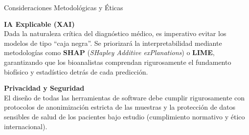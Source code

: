 \documentclass[12pt,letterpaper]{article}
\begin{document}
\begin{infobox}[colframe=tealmed, colback=white]{Consideraciones Metodológicas y Éticas}
    
    \begin{minipage}{0.48\textwidth}
        \textbf{\color{tealmed} IA Explicable (XAI)}\\[0.2cm]
        Dada la naturaleza crítica del diagnóstico médico, es imperativo evitar los modelos de tipo ``caja negra''. Se priorizará la interpretabilidad mediante metodologías como \textbf{SHAP} (\emph{SHapley Additive exPlanations}) o \textbf{LIME}, garantizando que los bioanalistas comprendan rigurosamente el fundamento biofísico y estadístico detrás de cada predicción.
    \end{minipage}
    \hfill
    \begin{minipage}{0.48\textwidth}
        \textbf{\color{tealmed} Privacidad y Seguridad}\\[0.2cm]
        El diseño de todas las herramientas de software debe cumplir rigurosamente con protocolos de anonimización estricta de las muestras y la protección de datos sensibles de salud de los pacientes bajo estudio (cumplimiento normativo y ético internacional).
    \end{minipage}
    
\end{infobox}

\vspace{0.4cm}
\end{document}
